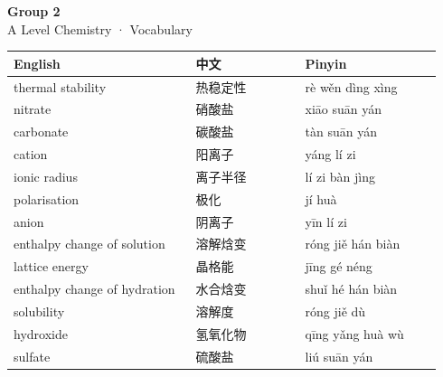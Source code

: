 \documentclass[11pt]{article}
\begin{document}
\begin{center}
  {\LARGE\bfseries Group 2}\\[0.35em]
  {\large A Level Chemistry · Vocabulary}
\end{center}
\vspace{0.6em}

\begin{longtable}{@{}p{0.40\linewidth}p{0.24\linewidth}p{0.30\linewidth}@{}}
\toprule
\textbf{English} & \textbf{中文} & \textbf{Pinyin} \\
\midrule
\endhead
\bottomrule
\endlastfoot
thermal stability & 热稳定性 & rè wěn dìng xìng \\
nitrate & 硝酸盐 & xiāo suān yán \\
carbonate & 碳酸盐 & tàn suān yán \\
cation & 阳离子 & yáng lí zi \\
ionic radius & 离子半径 & lí zi bàn jìng \\
polarisation & 极化 & jí huà \\
anion & 阴离子 & yīn lí zi \\
enthalpy change of solution & 溶解焓变 & róng jiě hán biàn \\
lattice energy & 晶格能 & jīng gé néng \\
enthalpy change of hydration & 水合焓变 & shuǐ hé hán biàn \\
solubility & 溶解度 & róng jiě dù \\
hydroxide & 氢氧化物 & qīng yǎng huà wù \\
sulfate & 硫酸盐 & liú suān yán \\
\end{longtable}
\end{document}
